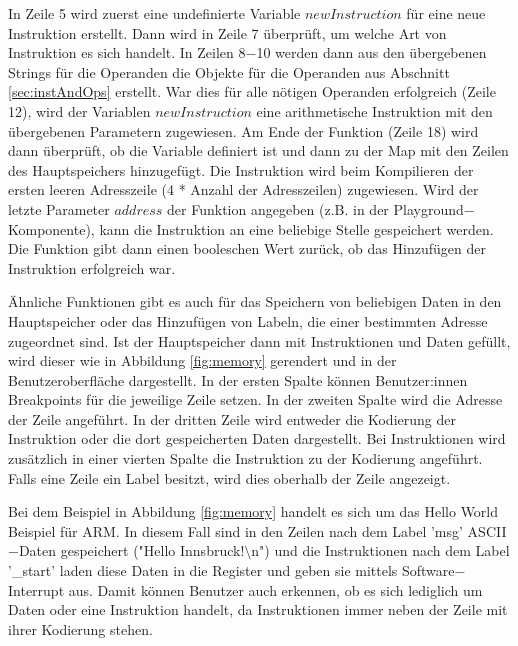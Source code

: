 \documentclass[a4paper, 11pt, onecolumn]{article}
\begin{document}
In Zeile 5 wird zuerst eine undefinierte Variable $newInstruction$ für eine neue Instruktion erstellt. Dann wird in Zeile 7 überprüft, um welche Art von Instruktion es sich handelt. In Zeilen 8$-$10 werden dann aus den übergebenen Strings für die Operanden die Objekte für die Operanden aus Abschnitt \ref{sec:instAndOps} erstellt. War dies für alle nötigen Operanden erfolgreich (Zeile 12), wird der Variablen $newInstruction$ eine arithmetische Instruktion mit den übergebenen Parametern zugewiesen. Am Ende der Funktion (Zeile 18) wird dann überprüft, ob die Variable definiert ist und dann zu der Map mit den Zeilen des Hauptspeichers hinzugefügt. Die Instruktion wird beim Kompilieren der ersten leeren Adresszeile (4 * Anzahl der Adresszeilen) zugewiesen. Wird der letzte Parameter $address$ der Funktion angegeben (z.B. in der Playground$-$Komponente), kann die Instruktion an eine beliebige Stelle gespeichert werden. Die Funktion gibt dann einen booleschen Wert zurück, ob das Hinzufügen der Instruktion erfolgreich war.

Ähnliche Funktionen gibt es auch für das Speichern von beliebigen Daten in den Hauptspeicher oder das Hinzufügen von Labeln, die einer bestimmten Adresse zugeordnet sind. Ist der Hauptspeicher dann mit Instruktionen und Daten gefüllt, wird dieser wie in Abbildung \ref{fig:memory} gerendert und in der Benutzeroberfläche dargestellt. In der ersten Spalte können Benutzer:innen Breakpoints für die jeweilige Zeile setzen. In der zweiten Spalte wird die Adresse der Zeile angeführt. In der dritten Zeile wird entweder die Kodierung der Instruktion oder die dort gespeicherten Daten dargestellt. Bei Instruktionen wird zusätzlich in einer vierten Spalte die Instruktion zu der Kodierung angeführt. Falls eine Zeile ein Label besitzt, wird dies oberhalb der Zeile angezeigt.

Bei dem Beispiel in Abbildung \ref{fig:memory} handelt es sich um das Hello World Beispiel für ARM. In diesem Fall sind in den Zeilen nach dem Label 'msg' ASCII$-$Daten gespeichert ("Hello Innsbruck!$\setminus$n") und die Instruktionen nach dem Label '\_start' laden diese Daten in die Register und geben sie mittels Software$-$Interrupt aus. Damit können Benutzer auch erkennen, ob es sich lediglich um Daten oder eine Instruktion handelt, da Instruktionen immer neben der Zeile mit ihrer Kodierung stehen.
\end{document}
